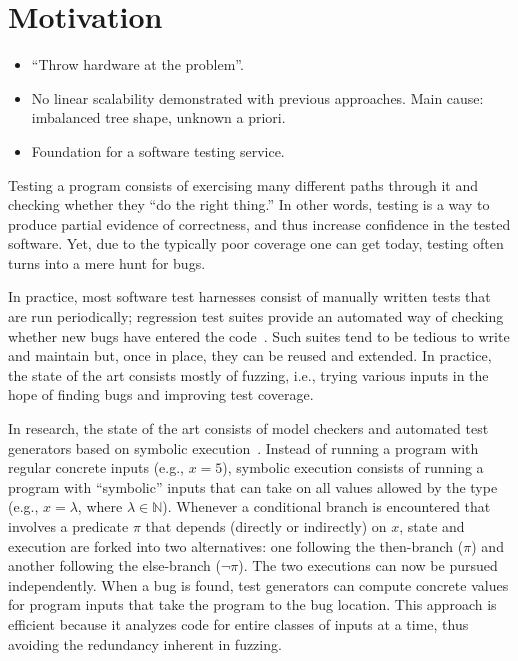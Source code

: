 \section{Motivation}

\begin{itemize}
\item ``Throw hardware at the problem''.
\item No linear scalability demonstrated with previous approaches. Main cause: imbalanced tree shape, unknown a priori.
\item Foundation for a software testing service.
\end{itemize}

Testing a program consists of exercising many different paths through it and checking whether they ``do the right thing.''  In other words, testing is a way to produce partial evidence of correctness, and thus increase confidence in the tested software.  Yet, due to the typically poor coverage one can get today, testing often turns into a mere hunt for bugs.

In practice, most software test harnesses consist of manually written tests that are run periodically; regression test suites provide an automated way of checking whether new bugs have entered the code~\cite{codeComplete}.  Such suites tend to be tedious to write and maintain but, once in place, they can be reused and extended.  In practice, the state of the art consists mostly of fuzzing, i.e., trying various inputs in the hope of finding bugs and improving test coverage.

In research, the state of the art consists of model checkers and automated test generators based on symbolic execution~\cite{dart,klee}.  Instead of running a program with regular concrete inputs (e.g., $x\!=\!5$), symbolic execution consists of running a program with ``symbolic'' inputs that can take on all values allowed by the type (e.g., $x\!=\!\lambda$, where $\lambda \in \mathbb{N}$).  Whenever a conditional branch is encountered that involves a predicate $\pi$ that depends (directly or indirectly) on $x$, state and execution are forked into two alternatives: one following the then-branch ($\pi$) and another following the else-branch ($\neg \pi$). The two executions can now be pursued independently.  When a bug is found, test generators can compute concrete values for program inputs that take the program to the bug location.  This approach is efficient because it analyzes code for entire classes of inputs at a time, thus avoiding the redundancy inherent in fuzzing.

